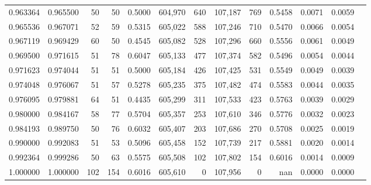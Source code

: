 \begin{tabular}{rrrrrrrrrrrrr}
0.963364 & 0.965500 &    50 &  50 &                                     0.5000 & 604,970 &     640 & 107,187 &     769 & 0.5458 & 0.0071 & 0.0059 \\
0.965536 & 0.967071 &    52 &  59 &                                     0.5315 & 605,022 &     588 & 107,246 &     710 & 0.5470 & 0.0066 & 0.0054 \\
0.967119 & 0.969429 &    60 &  50 &                                     0.4545 & 605,082 &     528 & 107,296 &     660 & 0.5556 & 0.0061 & 0.0049 \\
0.969500 & 0.971615 &    51 &  78 &                                     0.6047 & 605,133 &     477 & 107,374 &     582 & 0.5496 & 0.0054 & 0.0044 \\
0.971623 & 0.974044 &    51 &  51 &                                     0.5000 & 605,184 &     426 & 107,425 &     531 & 0.5549 & 0.0049 & 0.0039 \\
0.974048 & 0.976067 &    51 &  57 &                                     0.5278 & 605,235 &     375 & 107,482 &     474 & 0.5583 & 0.0044 & 0.0035 \\
0.976095 & 0.979881 &    64 &  51 &                                     0.4435 & 605,299 &     311 & 107,533 &     423 & 0.5763 & 0.0039 & 0.0029 \\
0.980000 & 0.984167 &    58 &  77 &                                     0.5704 & 605,357 &     253 & 107,610 &     346 & 0.5776 & 0.0032 & 0.0023 \\
0.984193 & 0.989750 &    50 &  76 &                                     0.6032 & 605,407 &     203 & 107,686 &     270 & 0.5708 & 0.0025 & 0.0019 \\
0.990000 & 0.992083 &    51 &  53 &                                     0.5096 & 605,458 &     152 & 107,739 &     217 & 0.5881 & 0.0020 & 0.0014 \\
0.992364 & 0.999286 &    50 &  63 &                                     0.5575 & 605,508 &     102 & 107,802 &     154 & 0.6016 & 0.0014 & 0.0009 \\
1.000000 & 1.000000 &   102 & 154 &                                     0.6016 & 605,610 &       0 & 107,956 &       0 &    nan & 0.0000 & 0.0000 \\
\bottomrule
\end{tabular}
